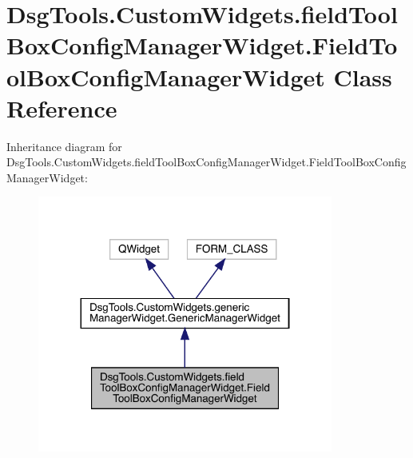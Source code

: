 \hypertarget{class_dsg_tools_1_1_custom_widgets_1_1field_tool_box_config_manager_widget_1_1_field_tool_box_config_manager_widget}{}\section{Dsg\+Tools.\+Custom\+Widgets.\+field\+Tool\+Box\+Config\+Manager\+Widget.\+Field\+Tool\+Box\+Config\+Manager\+Widget Class Reference}
\label{class_dsg_tools_1_1_custom_widgets_1_1field_tool_box_config_manager_widget_1_1_field_tool_box_config_manager_widget}


Inheritance diagram for Dsg\+Tools.\+Custom\+Widgets.\+field\+Tool\+Box\+Config\+Manager\+Widget.\+Field\+Tool\+Box\+Config\+Manager\+Widget\+:
\nopagebreak
\begin{figure}[H]
\begin{center}
\leavevmode
\includegraphics[width=275pt]{class_dsg_tools_1_1_custom_widgets_1_1field_tool_box_config_manager_widget_1_1_field_tool_box_coaf79749b69078339b6d754bfb416514a}
\end{center}
\end{figure}


